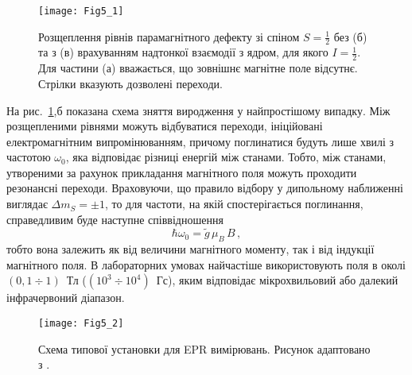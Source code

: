 \begin{figure}[!b]
\center
\vspace{-5mm}
\texttt{[image: Fig5\_1]}
\vspace{-3mm}
\caption{Розщеплення рівнів парамагнітного дефекту зі спіном $S=\frac{1}{2}$
без (б) та з (в) врахуванням надтонкої взаємодії з ядром, для якого  $I=\frac{1}{2}$.
Для частини (а) вважається, що зовнішнє магнітне поле відсутнє.
Стрілки вказують дозволені переходи.
}
\vspace{-3mm}
\label{F51}
\end{figure}

На рис.~\ref{F51},б показана схема зняття виродження у найпростішому випадку.
Між розщепленими рівнями можуть відбуватися переходи, ініційовані
електромагнітним випромінюванням, причому
поглинатися будуть лише хвилі з частотою $\omega_0$,
яка відповідає різниці енергій між станами.
Тобто, між станами, утвореними за рахунок прикладання магнітного поля можуть
проходити резонансні переходи.
Враховуючи, що правило відбору у дипольному наближенні виглядає $\Delta m_S=\pm1$,
то для частоти, на якій спостерігається поглинання, справедливим буде наступне співвідношення
\begin{equation}
\hbar\omega_0=\tilde{g}\, \mu_B\,B\,,
\end{equation}
тобто вона залежить як від величини магнітного моменту, так і від індукції магнітного поля.
В лабораторних умовах найчастіше використовують поля в околі $(0,1\div1)$~Тл ($(10^3\div10^4)$~Гс),
яким
відповідає
мікрохвильовий або далекий інфрачервоний діапазон.

\begin{figure}[!b]
\center
\vspace{-5mm}
\texttt{[image: Fig5\_2]}
\vspace{-3mm}
\caption{Схема типової установки для EPR вимірювань.
Рисунок адаптовано з \cite{tuomisto2019}.
}
\vspace{-3mm}
\label{F52}
\end{figure}



